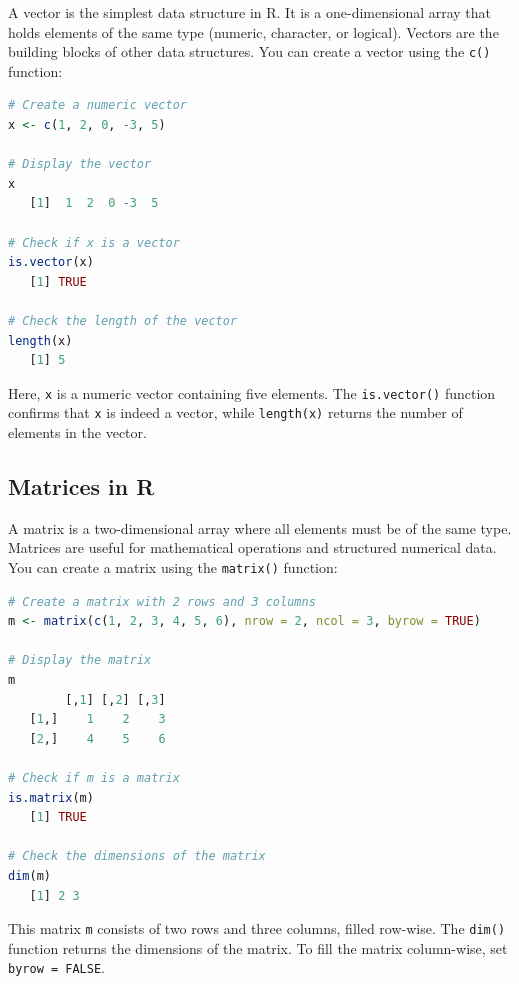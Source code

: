 \documentclass[
]{book}
\newcommand{\passthrough}[1]{#1}
\theoremstyle{definition}
\theoremstyle{definition}
\theoremstyle{definition}
\theoremstyle{definition}
\theoremstyle{remark}
\begin{document}
A vector is the simplest data structure in R. It is a one-dimensional array that holds elements of the same type (numeric, character, or logical). Vectors are the building blocks of other data structures. You can create a vector using the \passthrough{\lstinline!c()!} function:

\begin{lstlisting}[language=R]
# Create a numeric vector
x <- c(1, 2, 0, -3, 5)

# Display the vector
x
   [1]  1  2  0 -3  5

# Check if x is a vector
is.vector(x)
   [1] TRUE

# Check the length of the vector
length(x)
   [1] 5
\end{lstlisting}

Here, \passthrough{\lstinline!x!} is a numeric vector containing five elements. The \passthrough{\lstinline!is.vector()!} function confirms that \passthrough{\lstinline!x!} is indeed a vector, while \passthrough{\lstinline!length(x)!} returns the number of elements in the vector.

\subsection*{Matrices in R}\label{matrices-in-r}

A matrix is a two-dimensional array where all elements must be of the same type. Matrices are useful for mathematical operations and structured numerical data. You can create a matrix using the \passthrough{\lstinline!matrix()!} function:

\begin{lstlisting}[language=R]
# Create a matrix with 2 rows and 3 columns
m <- matrix(c(1, 2, 3, 4, 5, 6), nrow = 2, ncol = 3, byrow = TRUE)

# Display the matrix
m
        [,1] [,2] [,3]
   [1,]    1    2    3
   [2,]    4    5    6

# Check if m is a matrix
is.matrix(m)
   [1] TRUE

# Check the dimensions of the matrix
dim(m)
   [1] 2 3
\end{lstlisting}

This matrix \passthrough{\lstinline!m!} consists of two rows and three columns, filled row-wise. The \passthrough{\lstinline!dim()!} function returns the dimensions of the matrix. To fill the matrix column-wise, set \passthrough{\lstinline!byrow = FALSE!}.
\end{document}
